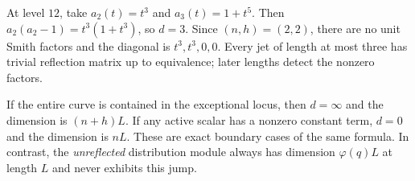 At level $12$, take $a_2(t)=t^3$ and $a_3(t)=1+t^5$.
Then $a_2(a_2-1)=t^3(1+t^3)$, so $d=3$. Since $(n,h)=(2,2)$,
there are no unit Smith factors and the diagonal is
$t^3,t^3,0,0$. Every jet of length at most three has trivial
reflection matrix up to equivalence; later lengths detect the
nonzero factors.

If the entire curve is contained in the exceptional locus, then
$d=\infty$ and the dimension is $(n+h)L$. If any active scalar
has a nonzero constant term, $d=0$ and the dimension is $nL$.
These are exact boundary cases of the same formula. In contrast,
the \emph{unreflected} distribution module always has dimension
$\varphi(q)L$ at length $L$ and never exhibits this jump.
